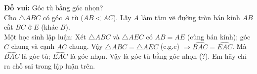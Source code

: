 \begin{bt} %
	\textbf{Đố vui:} Góc tù bằng góc nhọn?\\
	Cho $\triangle ABC$ có góc $A$ tù ($AB < AC$). Lấy $A$ làm tâm vẽ đường tròn bán kính $AB$ cắt $BC$ ở $E$ (khác $B$).\\
	Một học sinh lập luận: Xét $\triangle ABC$ và $\triangle AEC$ có $AB = AE$ (cùng bán kính); góc $C$ chung và cạnh $AC$ chung. Vậy $\triangle ABC = \triangle AEC$ (c.g.c) $\Rightarrow \widehat{BAC} = \widehat{EAC}$. Mà $\widehat{BAC}$ là góc tù; $\widehat{EAC}$ là góc nhọn. Vậy là góc tù bằng góc nhọn (?). Em hãy chỉ ra chỗ sai trong lập luận trên.
	
	
\end{bt}
